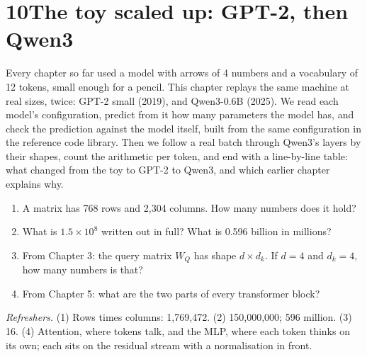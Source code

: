\newpage
\section*{10\quad The toy scaled up: GPT-2, then Qwen3}
\providecommand{\nTenFit}[1]{\setbox0\hbox{#1}\ifdim\wd0>\linewidth\resizebox{\linewidth}{!}{\usebox0}\else\usebox0\fi}

\begin{chaptermap}
Every chapter so far used a model with arrows of 4 numbers and a vocabulary of 12 tokens, small enough for a
pencil. This chapter replays the same machine at real sizes, twice: GPT-2 small (2019), and Qwen3-0.6B (2025).
We read each model's configuration, predict from it how many parameters the model has, and check the
prediction against the model itself, built from the same configuration in the reference code library. Then we
follow a real batch through Qwen3's layers by their shapes, count the arithmetic per token, and end with a
line-by-line table: what changed from the toy to GPT-2 to Qwen3, and which earlier chapter explains why.
\end{chaptermap}


\begin{beforeyoustart}
\begin{enumerate}[label=\arabic*.,leftmargin=1.6em]
\item A matrix has 768 rows and 2{,}304 columns. How many numbers does it hold?
\item What is $1.5\times10^{8}$ written out in full? What is 0.596 billion in millions?
\item From Chapter 3: the query matrix $W_Q$ has shape $d\times d_k$. If $d=4$ and $d_k=4$, how many numbers is that?
\item From Chapter 5: what are the two parts of every transformer block?
\end{enumerate}
\textit{Refreshers.} (1) Rows times columns: 1{,}769{,}472. (2) 150{,}000{,}000; 596 million. (3) 16.
(4) Attention, where tokens talk, and the MLP, where each token thinks on its own; each sits on the
residual stream with a normalisation in front.
\end{beforeyoustart}

